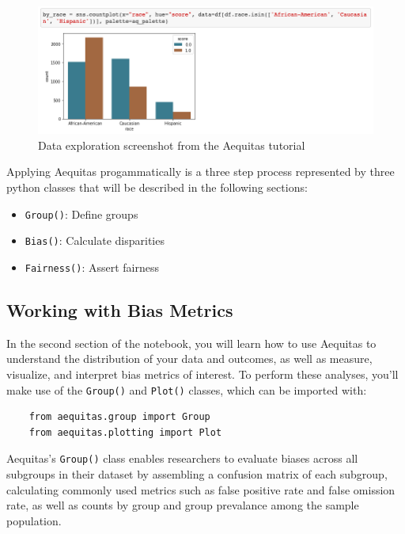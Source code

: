 \documentclass[]{krantz}
\begin{document}
\begin{figure}

{\centering \includegraphics[width=1\linewidth]{ChapterBias/figures/tutorial_explore} 

}

\caption{Data exploration screenshot from the Aequitas tutorial}\label{fig:tutorial-explore}
\end{figure}

Applying Aequitas progammatically is a three step process represented by
three python classes that will be described in the following sections:

\begin{itemize}
\item
  \texttt{Group()}: Define groups
\item
  \texttt{Bias()}: Calculate disparities
\item
  \texttt{Fairness()}: Assert fairness
\end{itemize}

\subsection{Working with Bias Metrics}\label{working-with-bias-metrics}

In the second section of the notebook, you will learn how to use
Aequitas to understand the distribution of your data and outcomes, as
well as measure, visualize, and interpret bias metrics of interest. To
perform these analyses, you'll make use of the \texttt{Group()} and
\texttt{Plot()} classes, which can be imported with:

\begin{verbatim}
    from aequitas.group import Group
    from aequitas.plotting import Plot
\end{verbatim}

Aequitas's \texttt{Group()} class enables researchers to evaluate biases
across all subgroups in their dataset by assembling a confusion matrix
of each subgroup, calculating commonly used metrics such as false
positive rate and false omission rate, as well as counts by group and
group prevalance among the sample population.
\end{document}

